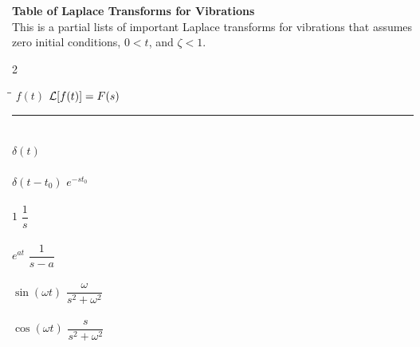 \documentclass[12pt,letter]{article}
\begin{document}

\pagestyle{empty}
\vspace{-25ex}
\begin{center}
{\large{}\textbf{Table of Laplace Transforms for Vibrations}} \\
\normalsize{} This is a partial lists of important Laplace transforms for vibrations that assumes \\ zero initial conditions, $0 < t$, and $\zeta < 1$.
\end{center}

\vspace{0ex}
{\small
\renewcommand{\arraystretch}{1.5}
\begin{multicols}{2}
\begin{center}
\begin{tabbing}
\hspace*{1.5 in}\=\hspace{1.5in}\= \kill
	$f(t)$ \> $\mathcal{L}{\left[f(t)\right]}=F(s)$ \> \\ \noindent\rule{8.0cm}{0.4pt} \\
	$\delta(t)$	 \> \LTNUM \\ \\
	$\delta(t-t_0)$ \> $e^{-st_0}$ \>\LTNUM \\ \\
	$1$       			 \> $\dfrac{1}{s}$           \>\LTNUM \\ \\
	$e^{at}$ 	\> $\dfrac{1}{s-a}$ 	\>\LTNUM \\ \\
	$\sin (\omega t) $ 	\> $\dfrac{\omega}{s^2+\omega^2}$ \>\LTNUM \\ \\
	$\cos (\omega t) $ 	\> $\dfrac{s}{s^2+\omega^2}$ \>\LTNUM \\ \\
	

\end{tabbing}
\end{center}
\end{multicols}}
\end{document}
